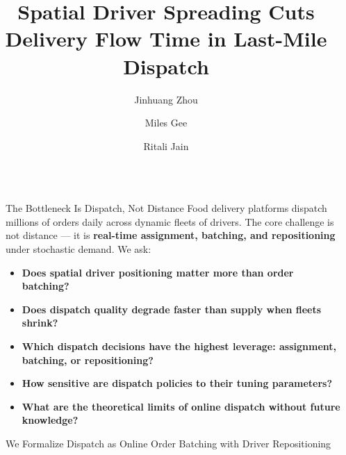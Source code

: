 \documentclass[final]{beamer}
\title{Spatial Driver Spreading Cuts Delivery Flow Time in Last-Mile Dispatch}
\author{Jinhuang Zhou \and Miles Gee \and Ritali Jain }
\institute[shortinst]{California Institute of Technology}
\newlength{\sepwidth}
\newlength{\colwidth}
\newcommand{\separatorcolumn}{\begin{column}{\sepwidth}\end{column}}
\begin{document}
{
}

\begin{frame}[t]
\begin{columns}[t]
\separatorcolumn

\begin{column}{\colwidth}

  \begin{block}{The Bottleneck Is Dispatch, Not Distance}
    Food delivery platforms dispatch millions of orders daily across dynamic fleets of drivers. The core challenge is not distance --- it is \textbf{real-time assignment, batching, and repositioning} under stochastic demand. We ask:
    \begin{itemize}
      \item \textbf{Does spatial driver positioning matter more than order batching?}
      \item \textbf{Does dispatch quality degrade faster than supply when fleets shrink?}
      \item \textbf{Which dispatch decisions have the highest leverage: assignment, batching, or repositioning?}
      \item \textbf{How sensitive are dispatch policies to their tuning parameters?}
      \item \textbf{What are the theoretical limits of online dispatch without future knowledge?}
    \end{itemize}

    \vspace{0.8em}

  \end{block}

  \begin{block}{We Formalize Dispatch as Online Order Batching with Driver Repositioning}

  
    \begin{center}
    \begin{tikzpicture}[scale=2,
      road/.style={draw=gray!35, line width=2pt},
      driver/.style={circle, draw=lime!60!black, fill=lime!30, minimum size=0.8cm, font=\small\bfseries},
      rest/.style={draw=orange!70!black, fill=orange!20, minimum size=0.8cm, font=\small\bfseries, inner sep=3pt},
      bag/.style={rounded corners=2pt, inner sep=3pt, font=\small},
      dlv/.style={-latex, line width=1.5pt},
      repo/.style={-latex, line width=1.5pt, dashed, orange!70!black},
      ann/.style={font=\small, inner sep=2pt},
    ]


\end{tikzpicture}
\end{center}
\end{block}
\end{column}
\end{columns}
\end{frame}
\end{document}

